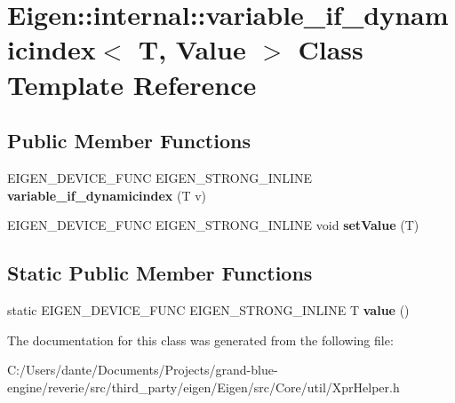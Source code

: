 \hypertarget{class_eigen_1_1internal_1_1variable__if__dynamicindex}{}\section{Eigen\+::internal\+::variable\+\_\+if\+\_\+dynamicindex$<$ T, Value $>$ Class Template Reference}
\label{class_eigen_1_1internal_1_1variable__if__dynamicindex}
\subsection*{Public Member Functions}
\begin{DoxyCompactItemize}
\item 
\mbox{\label{class_eigen_1_1internal_1_1variable__if__dynamicindex_ac645e04882eb7637517b167e6be13685}} 
E\+I\+G\+E\+N\+\_\+\+D\+E\+V\+I\+C\+E\+\_\+\+F\+U\+NC E\+I\+G\+E\+N\+\_\+\+S\+T\+R\+O\+N\+G\+\_\+\+I\+N\+L\+I\+NE {\bfseries variable\+\_\+if\+\_\+dynamicindex} (T v)
\item 
\mbox{\label{class_eigen_1_1internal_1_1variable__if__dynamicindex_aaab0719fcfb6d88e8b789bb706c2278c}} 
E\+I\+G\+E\+N\+\_\+\+D\+E\+V\+I\+C\+E\+\_\+\+F\+U\+NC E\+I\+G\+E\+N\+\_\+\+S\+T\+R\+O\+N\+G\+\_\+\+I\+N\+L\+I\+NE void {\bfseries set\+Value} (T)
\end{DoxyCompactItemize}
\subsection*{Static Public Member Functions}
\begin{DoxyCompactItemize}
\item 
\mbox{\label{class_eigen_1_1internal_1_1variable__if__dynamicindex_aee3eedba6289a0d91d26048bd36a0310}} 
static E\+I\+G\+E\+N\+\_\+\+D\+E\+V\+I\+C\+E\+\_\+\+F\+U\+NC E\+I\+G\+E\+N\+\_\+\+S\+T\+R\+O\+N\+G\+\_\+\+I\+N\+L\+I\+NE T {\bfseries value} ()
\end{DoxyCompactItemize}


The documentation for this class was generated from the following file\+:\begin{DoxyCompactItemize}
\item 
C\+:/\+Users/dante/\+Documents/\+Projects/grand-\/blue-\/engine/reverie/src/third\+\_\+party/eigen/\+Eigen/src/\+Core/util/Xpr\+Helper.\+h\end{DoxyCompactItemize}

